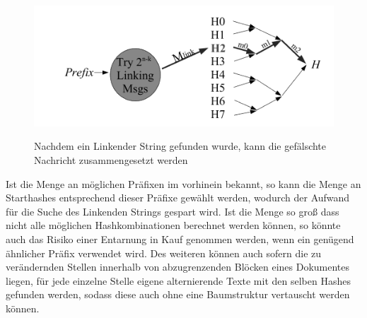 \documentclass[a4paper,12pt]{article}
\begin{document}
\begin{figure}[h!]
\centering
\includegraphics[scale=0.6]{Grafiken/HerdingAttack2_Linking.png}
\label{png:herdinglinking}
\caption{Nachdem ein Linkender String gefunden wurde, kann die gefälschte Nachricht zusammengesetzt werden}
\end{figure}
Ist die Menge an möglichen Präfixen im vorhinein bekannt, so kann die Menge an Starthashes entsprechend dieser Präfixe gewählt werden, wodurch der Aufwand für die Suche des Linkenden Strings gespart wird. Ist die Menge so groß dass nicht alle möglichen Hashkombinationen berechnet werden können, so könnte auch das Risiko einer Entarnung in Kauf genommen werden, wenn ein genügend ähnlicher Präfix verwendet wird. Des weiteren können auch sofern die zu verändernden Stellen innerhalb von abzugrenzenden Blöcken eines Dokumentes liegen, für jede einzelne Stelle eigene alternierende Texte mit den selben Hashes gefunden werden, sodass diese auch ohne eine Baumstruktur vertauscht werden können.
\end{document}
